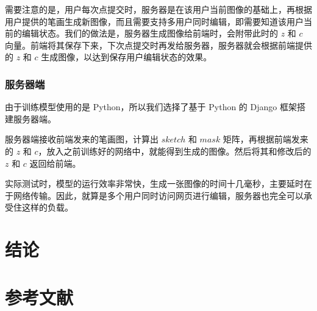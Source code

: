 \documentclass[a4paper,12pt,UTF8]{ctexart}
\begin{document}
需要注意的是，用户每次点提交时，服务器是在该用户当前图像的基础上，再根据用户提供的笔画生成新图像，而且需要支持多用户同时编辑，即需要知道该用户当前的编辑状态。我们的做法是，服务器生成图像给前端时，会附带此时的 $z$ 和 $c$ 向量。前端将其保存下来，下次点提交时再发给服务器，服务器就会根据前端提供的 $z$ 和 $c$ 生成图像，以达到保存用户编辑状态的效果。

\subsubsection{服务器端}
由于训练模型使用的是 Python，所以我们选择了基于 Python 的 Django 框架搭建服务器端。

服务器端接收前端发来的笔画图，计算出 $sketch$ 和 $mask$ 矩阵，再根据前端发来的 $z$ 和 $c$，放入之前训练好的网络中，就能得到生成的图像。然后将其和修改后的 $z$ 和 $c$ 返回给前端。

实际测试时，模型的运行效率非常快，生成一张图像的时间十几毫秒，主要延时在于网络传输。因此，就算是多个用户同时访问网页进行编辑，服务器也完全可以承受住这样的负载。

\section{结论}



\section*{参考文献}

\medskip

{\small


}
\end{document}
